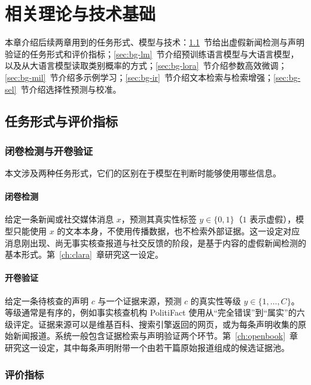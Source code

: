 \chapter{相关理论与技术基础}\label{ch:background}

本章介绍后续两章用到的任务形式、模型与技术：\ref{sec:bg-task}~节给出虚假新闻检测与声明验证的任务形式和评价指标；\ref{sec:bg-lm}~节介绍预训练语言模型与大语言模型，以及从大语言模型读取类别概率的方式；\ref{sec:bg-lora}~节介绍参数高效微调；\ref{sec:bg-mil}~节介绍多示例学习；\ref{sec:bg-ir}~节介绍文本检索与检索增强；\ref{sec:bg-sel}~节介绍选择性预测与校准。

\section{任务形式与评价指标}\label{sec:bg-task}

\subsection{闭卷检测与开卷验证}

本文涉及两种任务形式，它们的区别在于模型在判断时能够使用哪些信息。

\subsubsection{闭卷检测}
给定一条新闻或社交媒体消息 $x$，预测其真实性标签 $y\in\{0,1\}$（$1$ 表示虚假），模型只能使用 $x$ 的文本本身，不使用传播数据，也不检索外部证据。这一设定对应消息刚出现、尚无事实核查报道与社交反馈的阶段，是基于内容的虚假新闻检测的基本形式\citep{shu2017fake,zhou2020survey}。第~\ref{ch:clara}~章研究这一设定。

\subsubsection{开卷验证}
给定一条待核查的声明 $c$ 与一个证据来源，预测 $c$ 的真实性等级 $y\in\{1,\dots,C\}$。等级通常是有序的，例如事实核查机构 PolitiFact 使用从“完全错误”到“属实”的六级评定\citep{wang2017liar}。证据来源可以是维基百科\citep{thorne2018fever}、搜索引擎返回的网页\citep{popat2018declare,schlichtkrull2023averitec}，或为每条声明收集的原始新闻报道\citep{yang2022cofced}。系统一般包含证据检索与声明验证两个环节\citep{guo2022survey}。第~\ref{ch:openbook}~章研究这一设定，其中每条声明附带一个由若干篇原始报道组成的候选证据池。

\subsection{评价指标}

